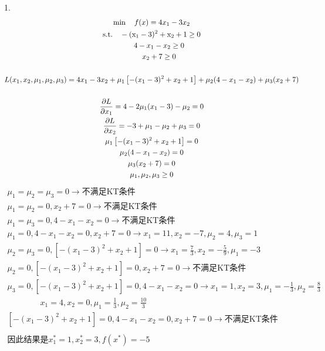 \documentclass{article}
\begin{document}
    1. \\
    \begin{gather*}  
        \min \quad f(x) = 4 x_1 - 3 x_2\\
        \rm{s.t.} \quad -(x_1 - 3)^2 + x_2 + 1 \ge 0\\
        \qquad 4 - x_1 - x_2 \ge 0\\
        \qquad x_2 + 7 \ge 0\\
        \\
        L(x_1, x_2, \mu_1, \mu_2, \mu_3) = 4x_1 - 3x_2
            + \mu_1\left[ -(x_1 -3)^2 + x_2 + 1\right] 
            + \mu_2 (4 - x_1 - x_2)
            + \mu_3 (x_2 + 7)\\
        \\
        \frac{\partial L}{\partial x_1} = 4 - 2 \mu_1 (x_1 - 3) - \mu_2 = 0\\
        \frac{\partial L}{\partial x_2} = -3 + \mu_1 - \mu_2 + \mu_3 = 0\\
        \mu_1 \left[-(x_1 - 3)^2 + x_2 + 1\right] = 0\\
        \mu_2 (4 - x_1 - x_2) = 0\\
        \mu_3 (x_2 + 7) = 0\\
        \mu_1, \mu_2, \mu_3 \ge 0
    \end{gather*}
    \begin{gather*}
    \mu_1 = \mu_2 = \mu_3 = 0 \rightarrow \text{不满足KT条件}\\
    \mu_1 = \mu_2 = 0, x_2 + 7 = 0 \rightarrow \text{不满足KT条件}\\
    \mu_1 = \mu_3 = 0, 4 - x_1 - x_2 = 0 \rightarrow \text{不满足KT条件}\\
    \mu_1 = 0, 4 - x_1 - x_2 = 0, x_2 + 7 = 0 \rightarrow x_1 = 11, x_2 = -7, \mu_2 = 4, \mu_3 = 1\\
    \mu_2 = \mu_3 = 0, \left[-(x_1 - 3)^2 + x_2 + 1\right] = 0 \rightarrow x_1 = \frac{7}{3}, x_2 = -\frac{5}{9}, \mu_1 = -3\\
    \mu_2 = 0,  \left[-(x_1 - 3)^2 + x_2 + 1\right] = 0 , x_2 + 7 = 0 \rightarrow \text{不满足KT条件}\\
    \mu_3 = 0,  \left[-(x_1 - 3)^2 + x_2 + 1\right] = 0 , 4 - x_1 - x_2 = 0 \rightarrow 
        x_1 = 1, x_2 = 3, \mu_1 = -\frac{1}{3}, \mu_2 = \frac{8}{3}\\\qquad \qquad
        x_1 = 4, x_2 = 0, \mu_1 = \frac{1}{3}, \mu_2 = \frac{10}{3}\\
    \left[-(x_1 - 3)^2 + x_2 + 1\right] = 0 , 4 - x_1 - x_2 = 0 , x_2 + 7 = 0 \rightarrow \text{不满足KT条件}\\
    \\ 
    \text{因此结果是} x_1^* = 1, x_2^* = 3, f(x^*) = -5
    \end{gather*}
\end{document}
